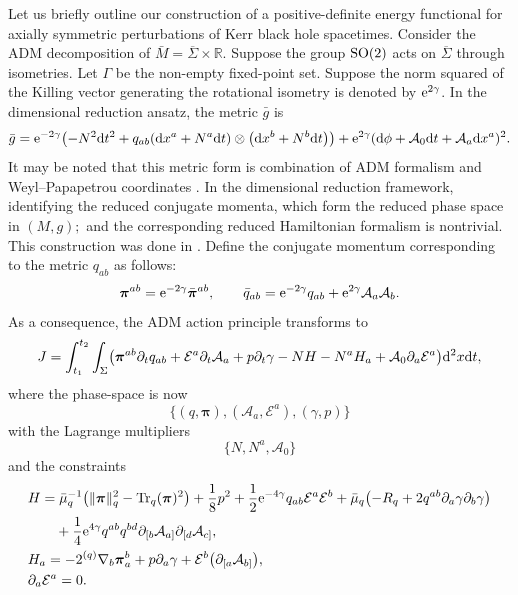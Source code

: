 \documentclass[pdftex]{sigma}
\def\ptl{\partial}%
\def\mbo#1{\boldsymbol{#1}}%
\def\olin#1{\overline{#1}{}}%
\def\grad{{\nabla}}%
\newcommand{\leftexp}[2]{{\vphantom{#2}}^{#1}{#2}}
\def\halb{\frac{1}{2}}%
\numberwithin{equation}{section}
\begin{document}
Let us briefly outline our construction of a positive-definite energy functional for axially symmetric perturbations of Kerr black hole spacetimes. Consider the ADM decomposition of $\bar{M}=\olin{\Sigma} \times \mathbb{R}$. Suppose the group ${\rm SO}(2)$ acts on $\olin{\Sigma}$ through isometries. Let $\Gamma$ be the non-empty fixed-point set. Suppose the norm squared of the Killing vector generating the rotational isometry is denoted by ${\rm e}^{2\gamma}$. In the dimensional reduction ansatz, the metric $\bar{g}$ is
\begin{align}\label{KK-ADM}
\bar{g} = {\rm e}^{-2\gamma} \bigl(-N^2 {\rm d}t^2 + q_{ab} ({\rm d}x^a + N^a {\rm d}t) \otimes \bigl({\rm d}x^b + N^b {\rm d}t\bigr)\bigr) + {\rm e}^{2\gamma} ({\rm d}\phi + \mathcal{A}_0 {\rm d}t + \mathcal{A}_a {\rm d}x^a)^2.
\end{align}
It may be noted that this metric form is combination of ADM formalism and Weyl--Papapetrou coordinates \cite{Moncrief_74}.
In the dimensional reduction framework, identifying the reduced conjugate momenta, which form the reduced phase space in $(M, g);$ and the corresponding reduced Hamiltonian formalism is nontrivial. This construction was done in \cite{kaluz1}. Define the conjugate momentum corresponding to the metric $q_{ab}$ as follows:
\begin{align*}
\mbo{\pi}^{ab} = {\rm e}^{-2\gamma} \bar{\mbo{\pi}}^{ab}, \qquad \bar{q}_{ab} = {\rm e}^{-2\gamma} q_{ab} + {\rm e}^{2\gamma} \mathcal{A}_a \mathcal{A}_b.
\end{align*}
As a consequence, the ADM action principle transforms to
\begin{align*}
J = \int^{t_2}_{t_1}\int_{\Sigma} \bigl(\mbo{\pi}^{ab} \ptl_t q_{ab} + \mathcal{E}^a \ptl_t \mathcal{A}_a + p \ptl_t \gamma - N H - N^aH_a+ \mathcal{A}_0 \ptl_a \mathcal{E}^a \bigr) {\rm d}^2x{\rm d}t,
\end{align*}
where the phase-space is now
\[
 \{ (q, \mbo{\pi}), (\mathcal{A}_a, \mathcal{E}^a), (\gamma, p) \}
\]
with the Lagrange multipliers
\[
 \{ N, N^a, \mathcal{A}_0 \}
\]
and the constraints
\begin{subequations} \label{2+1constraints}
\begin{align}
&H= \bar{\mu}^{-1}_q \bigl(\Vert \mbo{\pi} \Vert^2_q - {\rm Tr}_q(\mbo{\pi})^2\bigr) + \frac{1}{8} p^2 + \halb {\rm e}^{-4\gamma}
q_{ab} \mathcal{E}^a \mathcal{E}^b + \bar{\mu}_q \bigl(-R_q + 2 q^{ab} \ptl_a \gamma \ptl_b \gamma\bigr) \notag\\
&\hphantom{H=}{}+ \frac{1}{4} {\rm e}^{4\gamma} q^{ab}q^{bd} \ptl_{[b} \mathcal{A}_{a]} \ptl_{[d} \mathcal{A}_{c]}, \\
&H_a= -2 \leftexp{(q)}{ \grad}_b \mbo{\pi}^b_a + p \ptl_a \gamma + \mathcal{E}^b \bigl(\ptl_{[a}\mathcal{A}_{b]} \bigr),\\
&\ptl_a \mathcal{E}^a =0.
\end{align}
\end{subequations}
\end{document}
